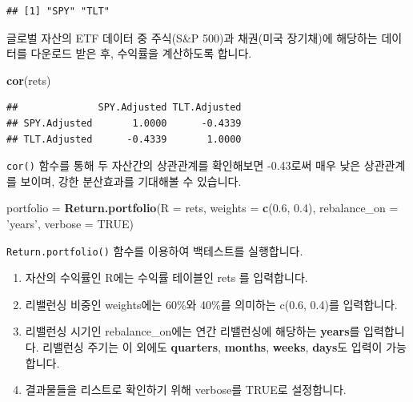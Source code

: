\documentclass[12pt,]{book}
\newenvironment{Shaded}{\begin{snugshade}}{\end{snugshade}}
\newcommand{\ControlFlowTok}[1]{\textcolor[rgb]{0.13,0.29,0.53}{\textbf{#1}}}
\newcommand{\DataTypeTok}[1]{\textcolor[rgb]{0.13,0.29,0.53}{#1}}
\newcommand{\FloatTok}[1]{\textcolor[rgb]{0.00,0.00,0.81}{#1}}
\newcommand{\KeywordTok}[1]{\textcolor[rgb]{0.13,0.29,0.53}{\textbf{#1}}}
\newcommand{\NormalTok}[1]{#1}
\newcommand{\OperatorTok}[1]{\textcolor[rgb]{0.81,0.36,0.00}{\textbf{#1}}}
\newcommand{\OtherTok}[1]{\textcolor[rgb]{0.56,0.35,0.01}{#1}}
\newcommand{\StringTok}[1]{\textcolor[rgb]{0.31,0.60,0.02}{#1}}
\providecommand{\tightlist}{%
  \setlength{\itemsep}{0pt}\setlength{\parskip}{0pt}}
\begin{document}
\begin{verbatim}
## [1] "SPY" "TLT"
\end{verbatim}

\begin{Shaded}
\end{Shaded}

글로벌 자산의 ETF 데이터 중 주식(S\&P 500)과 채권(미국 장기채)에 해당하는 데이터를 다운로드 받은 후, 수익률을 계산하도록 합니다.

\begin{Shaded}
\begin{Highlighting}[]
\KeywordTok{cor}\NormalTok{(rets)}
\end{Highlighting}
\end{Shaded}

\begin{verbatim}
##              SPY.Adjusted TLT.Adjusted
## SPY.Adjusted       1.0000      -0.4339
## TLT.Adjusted      -0.4339       1.0000
\end{verbatim}

\texttt{cor()} 함수를 통해 두 자산간의 상관관계를 확인해보면 -0.43로써 매우 낮은 상관관계를 보이며, 강한 분산효과를 기대해볼 수 있습니다.

\begin{Shaded}
\begin{Highlighting}[]
\NormalTok{portfolio =}\StringTok{ }\KeywordTok{Return.portfolio}\NormalTok{(}\DataTypeTok{R =}\NormalTok{ rets,}
                             \DataTypeTok{weights =} \KeywordTok{c}\NormalTok{(}\FloatTok{0.6}\NormalTok{, }\FloatTok{0.4}\NormalTok{),}
                             \DataTypeTok{rebalance_on =} \StringTok{'years'}\NormalTok{,}
                             \DataTypeTok{verbose =} \OtherTok{TRUE}\NormalTok{)}
\end{Highlighting}
\end{Shaded}

\texttt{Return.portfolio()} 함수를 이용하여 백테스트를 실행합니다.

\begin{enumerate}
\def\labelenumi{\arabic{enumi}.}
\tightlist
\item
  자산의 수익률인 R에는 수익률 테이블인 rets 를 입력합니다.
\item
  리밸런싱 비중인 weights에는 60\%와 40\%를 의미하는 c(0.6, 0.4)를 입력합니다.
\item
  리밸런싱 시기인 rebalance\_on에는 연간 리밸런싱에 해당하는 \textbf{years}를 입력합니다. 리밸런싱 주기는 이 외에도 \textbf{quarters}, \textbf{months}, \textbf{weeks}, \textbf{days}도 입력이 가능합니다.
\item
  결과물들을 리스트로 확인하기 위해 verbose를 TRUE로 설정합니다.
\end{enumerate}
\end{document}
